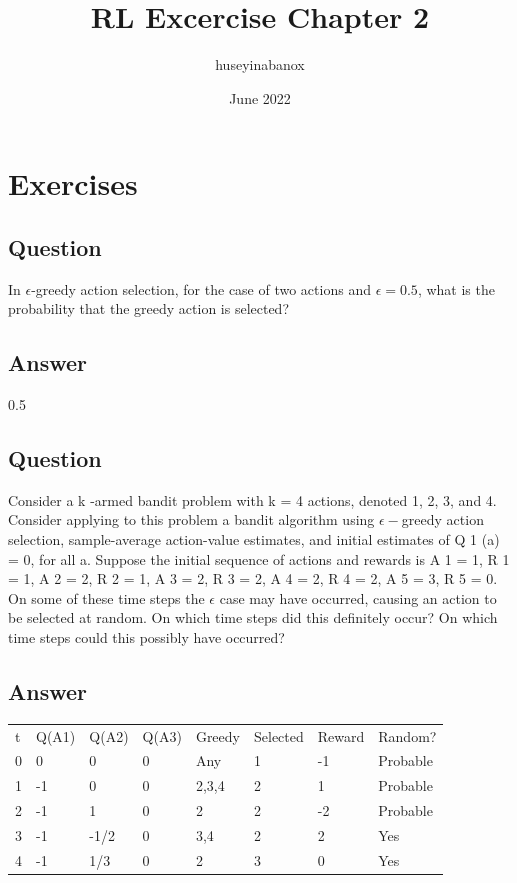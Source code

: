 \documentclass{article}
\title{RL Excercise Chapter 2}
\author{huseyinabanox }
\date{June 2022}
\begin{document}
    \maketitle
    \setcounter{section}{1}


    \section{Exercises}

    \subsection{Question}
    In \(\epsilon\)-greedy action selection, for the case of two actions and \(\epsilon = 0.5 \), what is the probability that the greedy action is selected?

    \subsection*{Answer}

    0.5

    \subsection{Question}

    Consider a k -armed bandit problem with k = 4 actions,
    denoted 1, 2, 3, and 4. Consider applying to this problem a bandit algorithm using
    $\epsilon-$greedy action selection, sample-average action-value estimates, and initial estimates
    of Q 1 (a) = 0, for all a. Suppose the initial sequence of actions and rewards is A 1 = 1,
    R 1 = 1, A 2 = 2, R 2 = 1, A 3 = 2, R 3 = 2, A 4 = 2, R 4 = 2, A 5 = 3, R 5 = 0. On some
    of these time steps the $\epsilon$ case may have occurred, causing an action to be selected at
    random. On which time steps did this definitely occur? On which time steps could this
    possibly have occurred?

    \subsection*{Answer}

    \begin{table}[]
        \begin{tabular}{llllllll}
            t & Q(A1) & Q(A2) & Q(A3) & Greedy & Selected & Reward & Random?  \\
            0 & 0     & 0     & 0     & Any    & 1        & -1     & Probable \\
            1 & -1    & 0     & 0     & 2,3,4  & 2        & 1      & Probable \\
            2 & -1    & 1     & 0     & 2      & 2        & -2     & Probable \\
            3 & -1    & -1/2  & 0     & 3,4    & 2        & 2      & Yes      \\
            4 & -1    & 1/3   & 0     & 2      & 3        & 0      & Yes      \\
        \end{tabular}
    \end{table}
\end{document}
